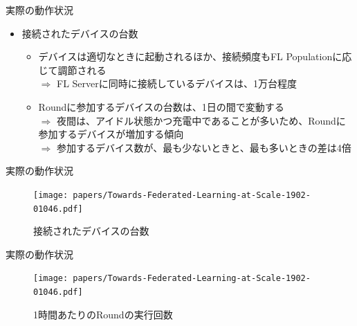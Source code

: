 \documentclass[dvipdfmx,notheorems,t]{beamer}
\begin{document}
\begin{frame}{実際の動作状況}

\begin{itemize}
	\item 接続されたデバイスの台数
	\begin{itemize}
		\item デバイスは適切なときに起動されるほか、接続頻度もFL Populationに応じて調節される \\
		$\Rightarrow$ FL Serverに同時に接続しているデバイスは、1万台程度
		\newline
		
		\item Roundに参加するデバイスの台数は、1日の間で変動する \\
		$\Rightarrow$ 夜間は、アイドル状態かつ充電中であることが多いため、Roundに参加するデバイスが増加する傾向 \\
		$\Rightarrow$ 参加するデバイス数が、最も少ないときと、最も多いときの差は4倍
	\end{itemize}
\end{itemize}

\end{frame}

\begin{frame}{実際の動作状況}

\begin{figure}
	\centering
	\texttt{[image: papers/Towards-Federated-Learning-at-Scale-1902-01046.pdf]}
	\caption{接続されたデバイスの台数~\cite{1902.01046}}
	\label{fig:connected-devices}
\end{figure}

\end{frame}

\begin{frame}{実際の動作状況}

\begin{figure}
	\centering
	\texttt{[image: papers/Towards-Federated-Learning-at-Scale-1902-01046.pdf]}
	\caption{1時間あたりのRoundの実行回数~\cite{1902.01046}}
	\label{fig:round-completion-rate}
\end{figure}

\end{frame}
\end{document}
